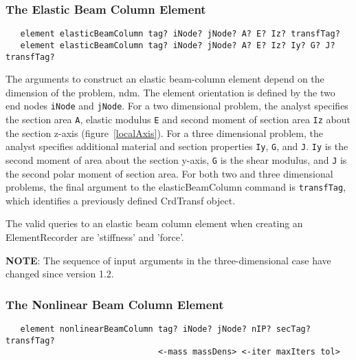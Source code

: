 \documentclass[12pt]{article}
\begin{document}
\subsubsection{The Elastic Beam Column Element}
{\sf\small
\begin{verbatim}
   element elasticBeamColumn tag? iNode? jNode? A? E? Iz? transfTag?
   element elasticBeamColumn tag? iNode? jNode? A? E? Iz? Iy? G? J? transfTag?
\end{verbatim}
}

\noindent The arguments to construct an elastic beam-column element depend on
the dimension of the problem, ndm. The element orientation is defined by
the two end nodes {\tt iNode} and {\tt jNode}. For a two dimensional problem,
the analyst specifies the section area {\tt A},
elastic modulus {\tt E} and second moment of section area {\tt Iz} about the
section z-axis (figure~\ref{localAxis}).
For a three dimensional problem, the analyst specifies additional
material and section properties {\tt Iy}, {\tt G}, and {\tt J}.
{\tt Iy} is the second moment of area about the section y-axis, {\tt G}
is the shear modulus, and {\tt J} is the second polar moment of section area.
For both two and three dimensional problems,
the final argument to the elasticBeamColumn command is {\tt transfTag},
which identifies a previously defined CrdTransf object. 

The valid queries to an elastic beam column element when creating an
ElementRecorder are 'stiffness' and 'force'.

{\bf NOTE}: The sequence of input arguments in the three-dimensional case
have changed since version 1.2.

\subsubsection{The Nonlinear Beam Column Element}
{\sf\small
\begin{verbatim}
   element nonlinearBeamColumn tag? iNode? jNode? nIP? secTag? transfTag?
                               <-mass massDens> <-iter maxIters tol> 
\end{verbatim}
}
\end{document}
